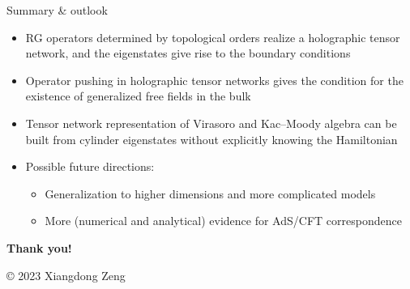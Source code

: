 \documentclass{fdubeamer}
\begin{document}
\begin{frame}{Summary \& outlook}

\begin{itemize}
  \item RG operators determined by topological orders realize a \alert{holographic tensor network}, and the eigenstates give rise to the boundary conditions
  \item Operator pushing in holographic tensor networks gives the condition for the existence of \alert{generalized free fields} in the bulk
  \item Tensor network representation of Virasoro and Kac--Moody algebra can be built from \alert{cylinder eigenstates} without explicitly knowing the Hamiltonian
  \item Possible future directions:

    \begin{itemize}
      \item Generalization to higher dimensions and more complicated models
      \item More (numerical and analytical) evidence for AdS/CFT correspondence
    \end{itemize}
\end{itemize}

\end{frame}

\begingroup
  \begin{frame}[plain]
    \vfill
    \begin{center}
      \color{white}
      \LARGE
      \textbf{Thank you!} \par
      \vspace{6em}
      \tiny
      \copyright{} 2023 Xiangdong Zeng
    \end{center}
    \vspace{-8em}
  \end{frame}
\endgroup

\appendix
\end{document}
